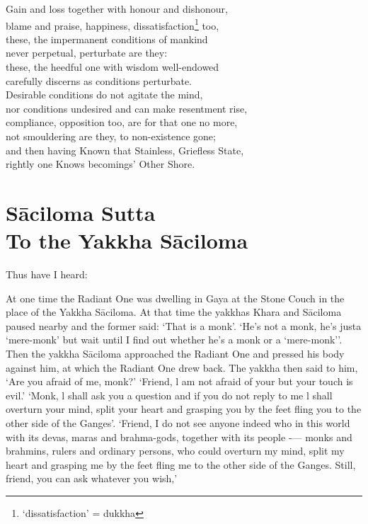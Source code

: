 \begin{MyDescription}[(A. Eights. 6)]{}
Gain and loss together with honour and dishonour,\\
blame and praise, happiness, dissatisfaction\footnote{`dissatisfaction' = dukkha} too,\\
these, the impermanent conditions of mankind\\
never perpetual, perturbate are they:\\
these, the heedful one with wisdom well-endowed\\
carefully discerns as conditions perturbate.\\
Desirable conditions do not agitate the mind,\\
nor conditions undesired and can make resentment rise,\\
compliance, opposition too, are for that one no more,\\
not smouldering are they, to non-existence gone;\\
and then having Known that Stainless, Grieﬂess State,\\
rightly one Knows becomings' Other Shore.\\
\end{MyDescription}

\begin{MyDescription}[(A. Eights. 6)]{}
\end{MyDescription}  

\chapter{S\=aciloma Sutta\\ To the Yakkha S\=aciloma}

Thus have I heard:\\
\newline

At one time the Radiant One was dwelling in Gaya at the Stone Couch in the place of the Yakkha S\=aciloma. At that time the yakkhas Khara and S\=aciloma paused nearby and the former said: `That is a monk'. `He's not a monk, he's justa `mere-monk' but wait until I ﬁnd out whether he's a monk or a `mere-monk''. Then the yakkha S\=aciloma approached the Radiant One and pressed his body against him, at which the Radiant One drew back. The yakkha then said to him, `Are you afraid of me, monk?' `Friend, l am not afraid of your but your touch is evil.' `Monk, l shall ask you a question and if you do not reply to me l shall overturn your mind, split your heart and grasping you by the feet fling you to the other side of the Ganges'. `Friend, I do not see anyone indeed who in this world with its devas, maras and brahma-gods, together with its people -— monks and brahmins, rulers and ordinary persons, who could overturn my mind, split my heart and grasping me by the feet ﬂing me to the other side of the Ganges. Still, friend, you can ask whatever you wish,'\\

